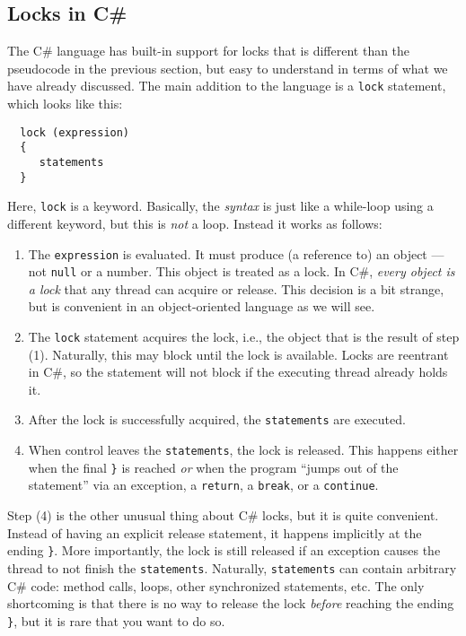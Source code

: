 \documentclass[10pt]{article}
\begin{document}
\subsection{Locks in C\#}
\label{sec:csharp-locks}

The C\# language has built-in support for locks that is different
than the pseudocode in the previous section, but easy to understand in
terms of what we have already discussed.  The main addition to the
language is a {\tt lock} statement, which looks like this:
\begin{verbatim}
  lock (expression)
  {
     statements
  }
\end{verbatim}
Here, {\tt lock} is a keyword.  Basically, the \emph{syntax}
is just like a while-loop using a different keyword, but this is
\emph{not} a loop.  Instead it works as follows:
\begin{enumerate}
\item The {\tt expression} is evaluated.  It must produce (a reference
  to) an object --- not {\tt null} or a number.  This object is
  treated as a lock.  In C\#, \emph{every object is a lock} that any
  thread can acquire or release.  This decision is a bit strange, but
  is convenient in an object-oriented language as we will see.
\item The {\tt lock} statement acquires the lock, i.e., the object
  that is the result of step (1).  Naturally, this may block until the
  lock is available.  Locks are reentrant in C\#, so the statement
  will not block if the executing thread already holds it.
\item After the lock is successfully acquired, the {\tt statements}
  are executed.
\item When control leaves the {\tt statements}, the lock is released.
  This happens either when the final {\tt \}} is reached \emph{or}
  when the program ``jumps out of the statement'' via an exception, a
  {\tt return}, a {\tt break}, or a {\tt continue}.
\end{enumerate}
Step (4) is the other unusual thing about C\# locks, but it is quite
convenient.  Instead of having an explicit release statement, it
happens implicitly at the ending {\tt \}}.  More importantly, the
lock is still released if an exception causes the thread to not 
finish the {\tt statements}.  Naturally, {\tt statements} can contain
arbitrary C\# code: method calls, loops, other synchronized
statements, etc.  The only shortcoming is that there is no way to
release the lock \emph{before} reaching the ending {\tt \}}, but it
is rare that you want to do so.
\end{document}
